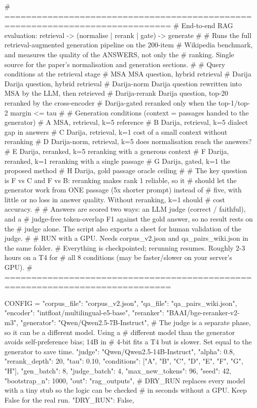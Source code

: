 # =============================================================================
# End-to-end RAG evaluation: retrieval -> (normalise | rerank | gate) -> generate
#
# Runs the full retrieval-augmented generation pipeline on the 200-item
# Wikipedia benchmark, and measures the quality of the ANSWERS, not only the
# ranking. Single source for the paper's normalisation and generation sections.
#
# Query conditions at the retrieval stage
#   MSA              MSA question, hybrid retrieval
#   Darija           Darija question, hybrid retrieval
#   Darija-norm      Darija question rewritten into MSA by the LLM, then retrieved
#   Darija-rerank    Darija question, top-20 reranked by the cross-encoder
#   Darija-gated     reranked only when the top-1/top-2 margin <= tau
#
# Generation conditions (context = passages handed to the generator)
#   A  MSA, retrieval, k=5              reference
#   B  Darija, retrieval, k=5           dialect gap in answers
#   C  Darija, retrieval, k=1           cost of a small context without reranking
#   D  Darija-norm, retrieval, k=5      does normalisation reach the answers?
#   E  Darija, reranked, k=5            reranking with a generous context
#   F  Darija, reranked, k=1            reranking with a single passage
#   G  Darija, gated, k=1               the proposed method
#   H  Darija, gold passage             oracle ceiling
#
# The key question is F vs C and F vs B: reranking makes rank 1 reliable, so it
# should let the generator work from ONE passage (5x shorter prompt) instead of
# five, with little or no loss in answer quality. Without reranking, k=1 should
# cost accuracy.
#
# Answers are scored two ways: an LLM judge (correct / faithful), and a
# judge-free token-overlap F1 against the gold answer, so no result rests on the
# judge alone. The script also exports a sheet for human validation of the judge.
#
# RUN with a GPU. Needs corpus_v2.json and qa_pairs_wiki.json in the same folder.
# Everything is checkpointed; rerunning resumes. Roughly 2-3 hours on a T4 for
# all 8 conditions (may be faster/slower on your server's GPU).
# =============================================================================

CONFIG = {
    "corpus_file": "corpus_v2.json",
    "qa_file": "qa_pairs_wiki.json",
    "encoder": "intfloat/multilingual-e5-base",
    "reranker": "BAAI/bge-reranker-v2-m3",
    "generator": "Qwen/Qwen2.5-7B-Instruct",
    # The judge is a separate phase, so it can be a different model. Using a
    # different model than the generator avoids self-preference bias; 14B in
    # 4-bit fits a T4 but is slower. Set equal to the generator to save time.
    "judge": "Qwen/Qwen2.5-14B-Instruct",
    "alpha": 0.8,
    "rerank_depth": 20,
    "tau": 0.10,
    "conditions": ["A", "B", "C", "D", "E", "F", "G", "H"],
    "gen_batch": 8,
    "judge_batch": 4,
    "max_new_tokens": 96,
    "seed": 42,
    "bootstrap_n": 1000,
    "out": "rag_outputs",
    # DRY_RUN replaces every model with a tiny stub so the logic can be checked
    # in seconds without a GPU. Keep False for the real run.
    "DRY_RUN": False,
}

